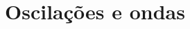 \documentclass[t,%
brazilian,%
11pt,%
aspectratio=169,%
table%
]{beamer}
\begin{document}





\section{Oscilações e ondas}
\end{document}
